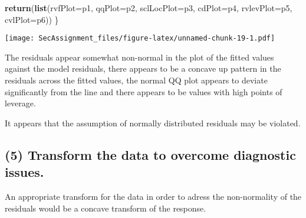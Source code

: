 \documentclass[12pt]{article}
\newenvironment{Shaded}{\begin{snugshade}}{\end{snugshade}}
\newcommand{\ControlFlowTok}[1]{\textcolor[rgb]{0.13,0.29,0.53}{\textbf{#1}}}
\newcommand{\DataTypeTok}[1]{\textcolor[rgb]{0.13,0.29,0.53}{#1}}
\newcommand{\KeywordTok}[1]{\textcolor[rgb]{0.13,0.29,0.53}{\textbf{#1}}}
\newcommand{\NormalTok}[1]{#1}
\newcommand{\OperatorTok}[1]{\textcolor[rgb]{0.81,0.36,0.00}{\textbf{#1}}}
\newcommand{\StringTok}[1]{\textcolor[rgb]{0.31,0.60,0.02}{#1}}
\begin{document}
\begin{Shaded}
\begin{Highlighting}[]
    \KeywordTok{return}\NormalTok{(}\KeywordTok{list}\NormalTok{(}\DataTypeTok{rvfPlot=}\NormalTok{p1, }\DataTypeTok{qqPlot=}\NormalTok{p2, }\DataTypeTok{sclLocPlot=}\NormalTok{p3, }\DataTypeTok{cdPlot=}\NormalTok{p4, }\DataTypeTok{rvlevPlot=}\NormalTok{p5, }\DataTypeTok{cvlPlot=}\NormalTok{p6))}
\NormalTok{\}}
\end{Highlighting}
\end{Shaded}

\begin{Shaded}
\end{Shaded}

\texttt{[image: SecAssignment\_files/figure-latex/unnamed-chunk-19-1.pdf]}

The residuals appear somewhat non-normal in the plot of the fitted
values against the model residuals, there appears to be a concave up
pattern in the residuals across the fitted values, the normal QQ plot
appears to deviate significantly from the line and there appears to be
values with high points of leverage.

It appears that the assumption of normally distributed residuals may be
violated.

\hypertarget{transform-the-data-to-overcome-diagnostic-issues.}{%
\subsection{(5) Transform the data to overcome diagnostic
issues.}\label{transform-the-data-to-overcome-diagnostic-issues.}}

An appropriate transform for the data in order to adress the
non-normality of the residuals would be a concave transform of the
response.
\end{document}
